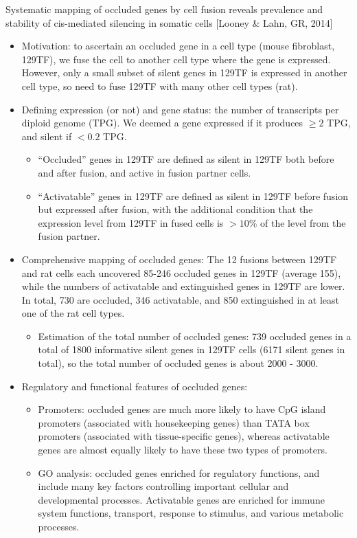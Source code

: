 \documentclass{report}
\begin{document}
Systematic mapping of occluded genes by cell fusion reveals prevalence and stability of cis-mediated silencing in somatic cells [Looney \& Lahn, GR, 2014]
\begin{itemize}
	\item Motivation: to ascertain an occluded gene in a cell type (mouse fibroblast, 129TF), we fuse the cell to another cell type where the gene is expressed. However, only a small subset of silent genes in 129TF is expressed in another cell type, so need to fuse 129TF with many other cell types (rat). 
	\item Defining expression (or not) and gene status:  the number of transcripts per diploid genome (TPG). We deemed a gene expressed if it produces $\geq 2$ TPG, and silent if $<0.2$ TPG.
	\begin{itemize}
		\item ``Occluded'' genes in 129TF are defined as silent in 129TF both before and after fusion, and active in fusion partner cells. 
		\item ``Activatable'' genes in 129TF are defined as silent in 129TF before fusion but expressed after fusion, with the additional condition that the expression level from 129TF in fused cells is $>10\%$ of the level from the fusion partner. 
	\end{itemize}
	\item Comprehensive mapping of occluded genes: The 12 fusions between 129TF and rat cells each uncovered 85-246 occluded genes in 129TF (average 155), while the numbers of activatable and extinguished genes in 129TF are lower. In total, 730 are occluded, 346 activatable, and 850 extinguished in at least one of the rat cell types. 
	\begin{itemize}
		\item Estimation of the total number of occluded genes: 739 occluded genes in a total of 1800 informative silent genes in 129TF cells (6171 silent genes in total), so the total number of occluded genes is about 2000 - 3000. 
	\end{itemize}
	\item Regulatory and functional features of occluded genes:
	\begin{itemize}
		\item Promoters: occluded genes are much more likely to have CpG island promoters (associated with housekeeping genes) than TATA box promoters (associated with tissue-specific genes), whereas activatable genes are almost equally likely to have these two types of promoters. 
		\item GO analysis: occluded genes enriched for regulatory functions, and include many key factors controlling important cellular and developmental processes. Activatable genes are enriched for immune system functions, transport, response to stimulus, and various metabolic processes.

\end{itemize}
\end{itemize}
\end{document}
